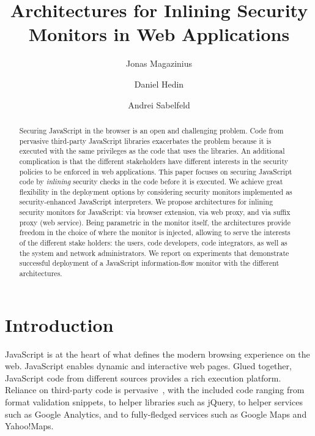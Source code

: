 \documentclass{llncs}
\title{Architectures for Inlining Security Monitors in Web Applications}
\author{Jonas Magazinius \and Daniel Hedin \and Andrei Sabelfeld}
\institute{Chalmers University of Technology, Gothenburg, Sweden}
\begin{document}
\maketitle

\thispagestyle{plain}

\begin{abstract}
Securing JavaScript in the browser is an open and challenging
problem. Code from pervasive third-party JavaScript libraries exacerbates the
problem because it is executed with the same privileges as the code
that uses the libraries.
%
An additional complication is that the different stakeholders have
different interests in the security policies to be enforced
in web applications.
%
This paper focuses on securing JavaScript code by \emph{inlining}
security checks in the code before it is executed.
%
We achieve great flexibility in the deployment options by considering
security monitors implemented as security-enhanced JavaScript interpreters.
%
We propose architectures for inlining security monitors for JavaScript: via
browser extension, via web proxy, and via suffix proxy (web service). 
%
Being parametric in the monitor itself,
the architectures provide freedom in the choice of where the monitor is
injected, allowing to serve the interests of the different stake
holders: the users, code developers, code
integrators, as well as the system and network administrators.
%
We report on experiments that demonstrate successful deployment of a JavaScript
information-flow monitor with the different architectures.
\end{abstract}










\vspace{-.4cm}
\section{Introduction}
\label{sec:intro}
\vspace{-.2cm}
JavaScript is at the heart of what defines the modern
browsing experience on the web. JavaScript enables dynamic and interactive
web pages. Glued together,
JavaScript code from different sources provides
a rich execution platform. Reliance on third-party code is
pervasive~\cite{Nikiforakis+:CCS12}, with the included code ranging from
format validation snippets, to helper
libraries such as jQuery, to helper services such as Google Analytics, and to fully-fledged services such as
Google Maps and Yahoo!\@ Maps.
\end{document}
